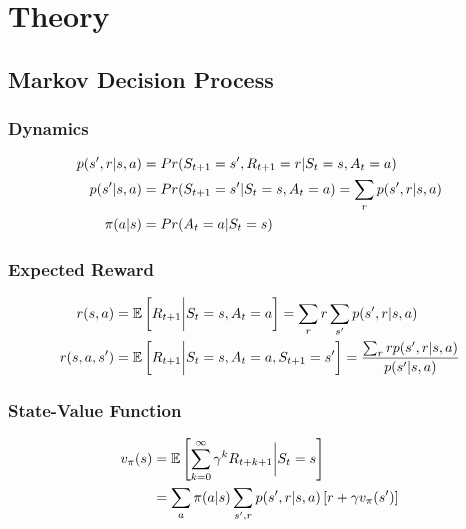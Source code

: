 \documentclass[result.tex]{subfiles}
\begin{document}
    \section*{\centering Theory}

    \subsection*{Markov Decision Process}

    \subsubsection*{Dynamics}

    \begin{align*}
        p(s^\prime, r | s, a) &=
        Pr(S_{t + 1} = s^\prime, R_{t + 1} = r | S_t = s, A_t = a) \\
        p(s^\prime | s, a) &=
        Pr(S_{t + 1} = s^\prime| S_t = s, A_t = a) =
        \sum_r p(s^\prime, r | s, a) \\
        \pi(a | s) &= Pr(A_t = a | S_t = s)
    \end{align*}

    \subsubsection*{Expected Reward}

    \begin{align*}
        r(s, a) &=
        \mathbb{E} \left[ R_{t + 1} \bigg\rvert S_t = s, A_t = a \right] =
        \sum_r r \sum_{s^\prime} p(s^\prime, r | s, a) \\
        r(s, a, s^\prime) &=
        \mathbb{E} \left[ R_{t + 1} \bigg\rvert S_t = s, A_t = a, S_{t + 1} = s^\prime \right] =
        \frac{\sum_r r p(s^\prime, r | s, a)}{p(s^\prime | s, a)}
    \end{align*}


    \subsubsection*{State-Value Function}

    \begin{align*}
        v_{\pi}(s) &= \mathbb{E} \left[ \sum_{k=0}^{\infty} \gamma^k R_{t + k + 1} \bigg\rvert S_t = s \right] \\
        &= \sum_a \pi(a | s) \sum_{s^\prime, r} p(s^\prime, r | s, a) \left[ r + \gamma v_\pi(s^\prime) \right]
    \end{align*}
\end{document}
